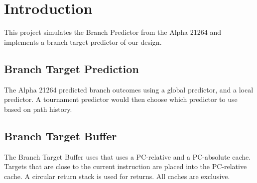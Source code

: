 \section{Introduction}
This project simulates the Branch Predictor from the Alpha 21264 and implements a branch target predictor of our design.

\subsection{Branch Target Prediction}
The Alpha 21264 predicted branch outcomes using a global predictor, and a local predictor. A tournament predictor would then choose which predictor to use based on path history.

\subsection{Branch Target Buffer}
The Branch Target Buffer uses that uses a PC-relative and a PC-absolute cache. Targets that are close to the current instruction are placed into the PC-relative cache. A circular return stack is used for returns. All caches are exclusive.

